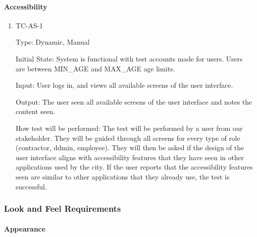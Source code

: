 \documentclass[12pt, titlepage]{article}
\begin{document}
\paragraph{Accessibility}
\begin{enumerate}
  \item{TC-AS-1\\}

    Type: Dynamic, Manual

    Initial State: System is functional with test accounts made for users. Users
    are between MIN\_AGE and MAX\_AGE age limits.

    Input: User logs in, and views all available screens of the user interface.

    Output: The user seen all available screens of
    the user interface and notes the content seen.

    How test will be performed: The test will be performed by a user from our
    stakeholder. They will be guided through all screens for every type of role
    (contractor, ddmin, employee). They will then be asked if the design
    of the user interface aligns with accessibility features that they have
    seen in other applications used by the city. If the user reports that the
    accessibility features seen are similar to other applications that
    they already use, the test is successful.

\end{enumerate}

\subsubsection{Look and Feel Requirements}

\paragraph{Appearance}
\end{document}
